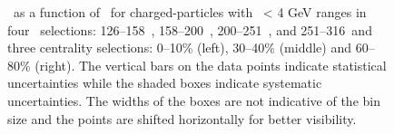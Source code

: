 
\begin{figure}
   \caption{\DeltaTheta\ as a function of \rvar\ for charged-particles with \pt\ < 4 GeV ranges in 
   four \ptjet\ selections: 126--158~\GeV, 158--200~\GeV, 200--251~\GeV, and 251--316~\GeV and three centrality 
   selections: 0--10\% (left), 30--40\% (middle) and 60--80\% (right). 
   The vertical bars on the data points indicate statistical uncertainties while the shaded boxes indicate systematic uncertainties. The widths of the boxes are not indicative of the bin size and the points are shifted horizontally for better visibility. }
      \label{fig:deltaPdeltaT}
\end{figure}


